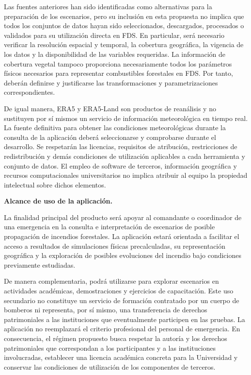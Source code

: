 Las fuentes anteriores han sido identificadas como alternativas para la preparación de los escenarios, pero su inclusión en esta propuesta no implica que todos los conjuntos de datos hayan sido seleccionados, descargados, procesados o validados para su utilización directa en FDS. En particular, será necesario verificar la resolución espacial y temporal, la cobertura geográfica, la vigencia de los datos y la disponibilidad de las variables requeridas. La información de cobertura vegetal tampoco proporciona necesariamente todos los parámetros físicos necesarios para representar combustibles forestales en FDS. Por tanto, deberán definirse y justificarse las transformaciones y parametrizaciones correspondientes.

De igual manera, ERA5 y ERA5-Land son productos de reanálisis y no sustituyen por sí mismos un servicio de información meteorológica en tiempo real. La fuente definitiva para obtener las condiciones meteorológicas durante la consulta de la aplicación deberá seleccionarse y comprobarse durante el desarrollo. Se respetarán las licencias, requisitos de atribución, restricciones de redistribución y demás condiciones de utilización aplicables a cada herramienta y conjunto de datos. El empleo de software de terceros, información geográfica y recursos computacionales universitarios no implica atribuir al equipo la propiedad intelectual sobre dichos elementos.

\textbf{Alcance de uso de la aplicación.}

La finalidad principal del producto será apoyar al comandante o coordinador de una emergencia en la consulta e interpretación de escenarios de posible propagación de incendios forestales. La aplicación estará orientada a facilitar el acceso a resultados de simulaciones físicas precalculadas, su representación geográfica y la exploración de posibles evoluciones del incendio bajo condiciones previamente estudiadas.

De manera complementaria, podrá utilizarse para explorar escenarios en actividades académicas, demostraciones y ejercicios de capacitación. Este uso secundario no constituye un servicio de formación contratado por un cuerpo de bomberos ni representa, por sí mismo, una transferencia de derechos patrimoniales a las instituciones que eventualmente participen en las pruebas. La aplicación no reemplazará el criterio profesional del personal de emergencia. En consecuencia, el régimen propuesto busca respetar la autoría y los derechos patrimoniales que correspondan a los participantes y a las instituciones involucradas, establecer una licencia académica concreta para la Universidad y conservar las condiciones de utilización de los componentes de terceros.
